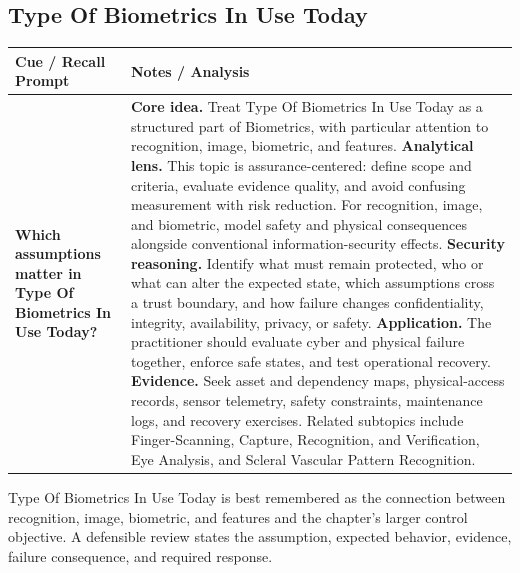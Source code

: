 \documentclass[11pt]{article}
\newcommand{\CornellHeader}{%
\rowcolor{Navy}\color{white}\bfseries Cue / Recall Prompt & \color{white}\bfseries Notes / Analysis\\\hline}
\newcommand{\CornellRow}[2]{%
\cellcolor{CueGray}\RaggedRight\textbf{#1} & \RaggedRight #2\\\hline}
\begin{document}
\subsection*{Type Of Biometrics In Use Today}
\begin{longtable}{>{\RaggedRight\arraybackslash}p{}|>{\RaggedRight\arraybackslash}p{}}
\CornellHeader
\CornellRow{Which assumptions matter in Type Of Biometrics In Use Today?}{\textbf{Core idea.} Treat Type Of Biometrics In Use Today as a structured part of Biometrics, with particular attention to recognition, image, biometric, and features. \textbf{Analytical lens.} This topic is assurance-centered: define scope and criteria, evaluate evidence quality, and avoid confusing measurement with risk reduction. For recognition, image, and biometric, model safety and physical consequences alongside conventional information-security effects. \textbf{Security reasoning.} Identify what must remain protected, who or what can alter the expected state, which assumptions cross a trust boundary, and how failure changes confidentiality, integrity, availability, privacy, or safety. \textbf{Application.} The practitioner should evaluate cyber and physical failure together, enforce safe states, and test operational recovery. \textbf{Evidence.} Seek asset and dependency maps, physical-access records, sensor telemetry, safety constraints, maintenance logs, and recovery exercises. Related subtopics include Finger-Scanning, Capture, Recognition, and Verification, Eye Analysis, and Scleral Vascular Pattern Recognition.}
\end{longtable}
\begin{topicsummary}
Type Of Biometrics In Use Today is best remembered as the connection between recognition, image, biometric, and features and the chapter's larger control objective. A defensible review states the assumption, expected behavior, evidence, failure consequence, and required response.
\end{topicsummary}
\end{document}
